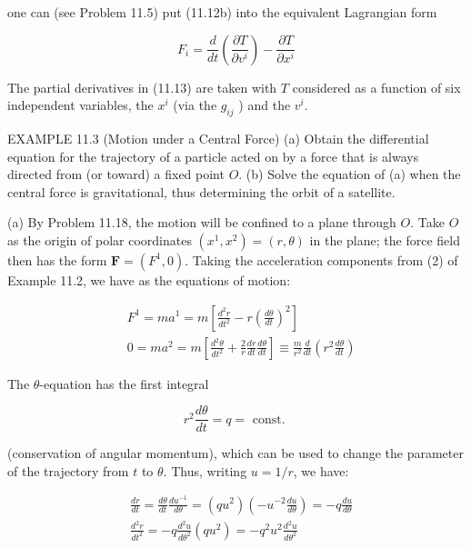 \documentclass[10pt]{article}
\begin{document}
one can (see Problem 11.5) put (11.12b) into the equivalent Lagrangian form


\begin{equation*}
F_{i}=\frac{d}{d t}\left(\frac{\partial T}{\partial v^{i}}\right)-\frac{\partial T}{\partial x^{i}} \tag{11.13}
\end{equation*}


The partial derivatives in (11.13) are taken with $T$ considered as a function of six independent variables, the $x^{i}$ (via the $g_{i j}$ ) and the $v^{i}$.

EXAMPLE 11.3 (Motion under a Central Force) (a) Obtain the differential equation for the trajectory of a particle acted on by a force that is always directed from (or toward) a fixed point $O$. (b) Solve the equation of (a) when the central force is gravitational, thus determining the orbit of a satellite.

(a) By Problem 11.18, the motion will be confined to a plane through $O$. Take $O$ as the origin of polar coordinates $\left(x^{1}, x^{2}\right)=(r, \theta)$ in the plane; the force field then has the form $\mathbf{F}=\left(F^{1}, 0\right)$. Taking the acceleration components from (2) of Example 11.2, we have as the equations of motion:

$$
\begin{aligned}
& F^{1}=m a^{1}=m\left[\frac{d^{2} r}{d t^{2}}-r\left(\frac{d \theta}{d t}\right)^{2}\right] \\
& 0=m a^{2}=m\left[\frac{d^{2} \theta}{d t^{2}}+\frac{2}{r} \frac{d r}{d t} \frac{d \theta}{d t}\right] \equiv \frac{m}{r^{2}} \frac{d}{d t}\left(r^{2} \frac{d \theta}{d t}\right)
\end{aligned}
$$

The $\theta$-equation has the first integral

$$
r^{2} \frac{d \theta}{d t}=q=\text { const. }
$$

(conservation of angular momentum), which can be used to change the parameter of the trajectory from $t$ to $\theta$. Thus, writing $u=1 / r$, we have:

$$
\begin{aligned}
& \frac{d r}{d t}=\frac{d \theta}{d t} \frac{d u^{-1}}{d \theta}=\left(q u^{2}\right)\left(-u^{-2} \frac{d u}{d \theta}\right)=-q \frac{d u}{d \theta} \\
& \frac{d^{2} r}{d t^{2}}=-q \frac{d^{2} u}{d \theta^{2}}\left(q u^{2}\right)=-q^{2} u^{2} \frac{d^{2} u}{d \theta^{2}}
\end{aligned}
$$
\end{document}
